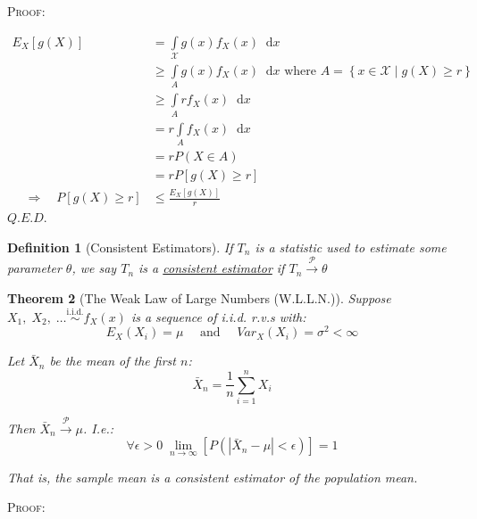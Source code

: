 \documentclass[12pt,a4paper]{article}
\newcommand{\imply}{\quad\Rightarrow\quad}
\newcommand{\diff}{\;\mathrm{d}}
\newtheorem{thm}{Theorem}[subsection]
\newtheorem{defn}[thm]{Definition}
\begin{document}
\noindent\textsc{Proof:}\par\vspace{1cm}

\begin{align*}
E_X\left[g(X)\right] &= \int\limits_{\mathcal{X}}\!\! g(x)f_X(x)\;\diff x\\
&\geq \int\limits_{A}\!\! g(x)f_X(x)\;\diff x \mbox{ where $A = \left\{x\in\mathcal{X}\mid g(X) \geq r\right\}$}\\
&\geq \int\limits_{A}\!\! rf_X(x)\;\diff x\\
&= r \int\limits_{A}\!\! f_X(x)\;\diff x\\
&= r P\left(X\in A\right)\\
&= r P\left[g(X)\geq r\right]\\
\imply P\left[g(X)\geq r\right] &\leq \frac{E_X\left[g(X)\right]}{r}
\end{align*}\hfill$Q.E.D.$\par\vspace{1cm}


\begin{defn}[Consistent Estimators]\vspace{1cm}

If $T_n$ is a statistic used to estimate some parameter $\theta$, we say $T_n$ is a \underline{consistent estimator} if $T_n\xrightarrow{\mathscr{P}}\theta$

\end{defn}

\begin{thm}[The Weak Law of Large Numbers (W.L.L.N.)]\vspace{1cm}

Suppose $X_1,\;X_2,\;\hdots \overset{\text{i.i.d.}}{\sim} f_X(x)$ is a sequence of i.i.d. r.v.s with:
$$E_X(X_i) = \mu\quad \text{ and }\quad Var_X(X_i) = \sigma^2 < \infty$$

Let $\bar{X}_n$ be the mean of the first $n$:
$$\bar{X}_n = \frac{1}{n} \sum_{i=1}^n X_i$$

Then $\bar{X}_n\xrightarrow{\mathscr{P}}\mu$. I.e.:
$$\forall \epsilon > 0 \;\lim_{n\to\infty}\left[P\left(\left|\bar{X}_n-\mu\right|<\epsilon\right)\right] = 1$$

That is, the sample mean is a consistent estimator of the population mean.

\end{thm}

\noindent\textsc{Proof:}\par\vspace{1cm}
\end{document}
